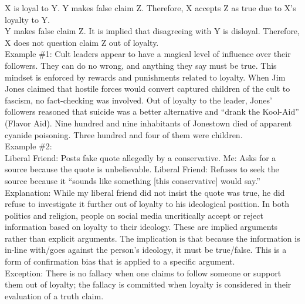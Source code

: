 \documentclass[a4paper,12pt,single,pdftex]{scrartcl}
\begin{document}
      
        X is loyal to Y. \newline
Y makes false claim Z. \newline
Therefore, X accepts Z as true due to X’s loyalty to Y.
      \\

      
        Y makes false claim Z. \newline
It is implied that disagreeing with Y is disloyal. \newline
Therefore, X does not question claim Z out of loyalty.
      \\

      
        Example \#1: Cult leaders appear to have a magical level of influence over their followers. They can do no wrong, and anything they say must be true. This mindset is enforced by rewards and punishments related to loyalty. When Jim Jones claimed that hostile forces would convert captured children of the cult to fascism, no fact-checking was involved. Out of loyalty to the leader, Jones’ followers reasoned that suicide was a better alternative and “drank the Kool-Aid” (Flavor Aid). Nine hundred and nine inhabitants of Jonestown died of apparent cyanide poisoning. Three hundred and four of them were children.
      \\

      
        Example \#2: 
      \\

      
        Liberal Friend: Posts fake quote allegedly by a conservative. \newline
Me: Asks for a source because the quote is unbelievable. \newline
Liberal Friend: Refuses to seek the source because it “sounds like something [this conservative] would say.”
      \\

      
        Explanation: While my liberal friend did not insist the quote was true, he did refuse to investigate it further out of loyalty to his ideological position. In both politics and religion, people on social media uncritically accept or reject information based on loyalty to their ideology. These are implied arguments rather than explicit arguments. The implication is that because the information is in-line with/goes against the person’s ideology, it must be true/false. This is a form of confirmation bias that is applied to a specific argument.
      \\

      
        Exception: There is no fallacy when one claims to follow someone or support them out of loyalty; the fallacy is committed when loyalty is considered in their evaluation of a truth claim.
      \\
\end{document}
